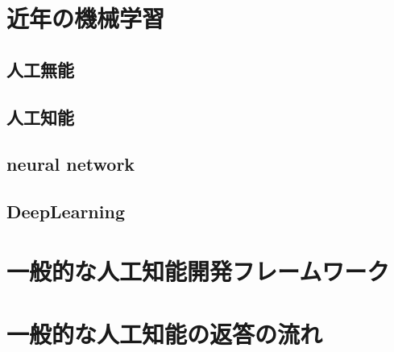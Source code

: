 
\section{近年の機械学習}
\subsection{人工無能}
\subsection{人工知能}
\subsection{neural network}
\subsection{DeepLearning}

\section{一般的な人工知能開発フレームワーク}

\section{一般的な人工知能の返答の流れ}

